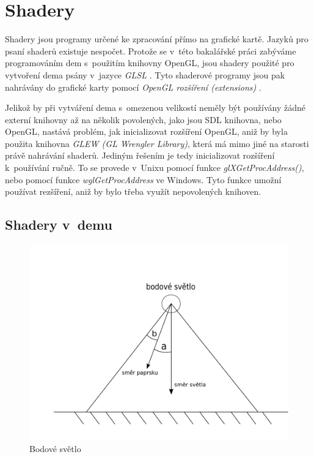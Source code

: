 \section{Shadery}
Shadery jsou programy určené ke zpracování přímo na grafické kartě.
Jazyků pro psaní shaderů existuje nespočet.
Protože se v~této bakalářské práci zabýváme programováním dem s~použitím knihovny OpenGL, jsou shadery použité pro vytvoření dema psány v~jazyce \emph{GLSL} \cite{OpenGL}.
Tyto shaderové programy jsou pak nahrávány do grafické karty pomocí \emph{OpenGL rozšíření (extensions)} \cite{extensionsOpenGL}.

Jelikož by při vytváření dema s~omezenou velikostí neměly být používány žádné externí knihovny až na několik povolených, jako jsou SDL knihovna, nebo OpenGL, nastává problém, jak inicializovat rozšíření OpenGL, aniž by byla použita knihovna \emph{GLEW (GL Wrengler Library)}, která má mimo jiné na starosti právě nahrávání shaderů.
Jediným řešením je tedy inicializovat rozšíření k~používání ručně.
To se provede v~Unixu pomocí funkce \emph{glXGetProcAddress()}, nebo pomocí funkce \emph{wglGetProcAddress} ve Windows.
Tyto funkce umožní používat rezšíření, aniž by bylo třeba využít nepovolených knihoven.

\subsection{Shadery v~demu}
\begin{figure}[h]
    \begin{center}
      \includegraphics[scale=0.45]{fig/svetloGLSL}
      \caption{Bodové světlo} 
      \label{svetloGlslFIG}
    \end{center}
\end{figure}

